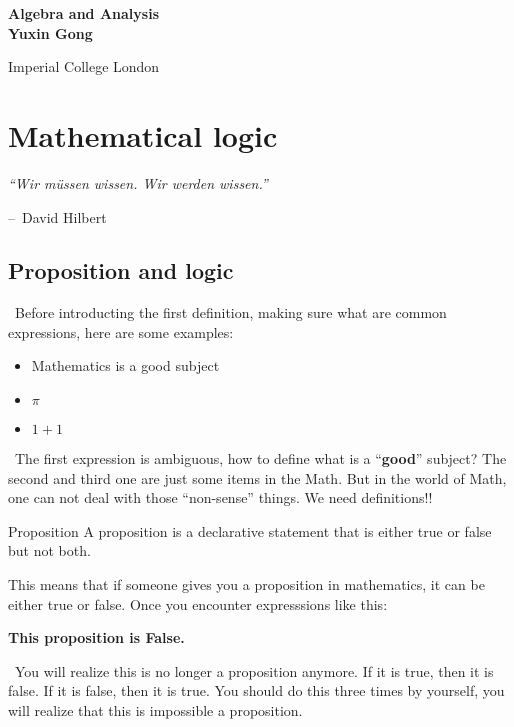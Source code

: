 \documentclass{article}
\makeatletter
\newenvironment{chapquote}[2][2em]
  {\setlength{\@tempdima}{#1}%
   \def\chapquote@author{#2}%
   \parshape 1 \@tempdima \dimexpr\textwidth-2\@tempdima\relax%
   \itshape}
  {\par\normalfont\hfill--\ \chapquote@author\hspace*{\@tempdima}\par\bigskip}
\makeatother
\begin{document}
\begin{titlepage}
    \begin{center}
        \vspace{8cm}
        {\fontsize{30}{30}\bfseries Algebra and Analysis} \\
        \vspace{0.5cm}
        \textbf{Yuxin Gong} \\
        \vfill

        \normalsize{Imperial College London} \\

    \end{center}
\end{titlepage}
\tableofcontents
\newpage
\section{Mathematical logic}
\begin{chapquote}{David Hilbert}
    ``Wir müssen wissen. Wir werden wissen.''
\end{chapquote}
\subsection{Proposition and logic}
\quad\ Before introducting the first definition, making sure what are common expressions,
here are some examples:
\begin{itemize}
    \item Mathematics is a good subject
    \item $\pi$
    \item $1 + 1$
\end{itemize}
\quad\ The first expression is ambiguous, how to define what is a ``\textbf{good}'' subject? The
second and third one are just some items in the Math. But in the world of Math, one can
not deal with those ``non-sense'' things. We need definitions!!
\begin{defin}{Proposition}
        A proposition is a declarative statement that is either true or false
        but not both.
\end{defin}
This means that if someone gives you a proposition in mathematics, it can be either true or
false. Once you encounter expresssions like this:
\begin{center}
    \textbf{This proposition is False.}
\end{center}
\quad\  
You will realize this is no longer a proposition anymore. If it is true, then it is false. If it is
false, then it is true. You should do this three times by yourself, you will realize that this is impossible
a proposition.\\
\end{document}
